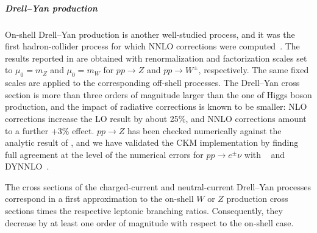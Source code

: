 \documentclass[english,11pt]{article}
\begin{document}
\newcommand{\mlll}{\ensuremath{m_{\ell\ell\ell}}}
\newcommand{\mwz}{\ensuremath{m_{WZ}}}
\newcommand{\mtw}{\ensuremath{m_{T,W}}}
\newcommand{\ptwz}{\ensuremath{p_{T,WZ}}}
\newcommand{\ptz}{\ensuremath{p_{T,Z}}}
\newcommand{\ptl}{\ensuremath{p_{T,\ell}}}
\newcommand{\ptlp}{\ensuremath{p_{T,\ell'}}}
\newcommand{\ptlsub}{\ensuremath{p_{T,\ell_{\ge2}}}}
\newcommand{\lw}{\ensuremath{\ell_{\textrm{w}}}}
\newcommand{\lpw}{\ensuremath{\ell^+_{\textrm{w}}}}
\newcommand{\lmw}{\ensuremath{\ell^-_{\textrm{w}}}}
\newcommand{\lpmw}{\ensuremath{\ell^{\pm}_{\textrm{w}}}}

\newcommand{\lz}{\ensuremath{\ell_{\textrm{z}}}}
\newcommand{\lpz}{\ensuremath{\ell^+_{\textrm{z}}}}
\newcommand{\lmz}{\ensuremath{\ell^-_{\textrm{z}}}}
\newcommand{\lpmz}{\ensuremath{\ell^{\pm}_{\textrm{z}}}}
\newcommand{\lzlead}{\ensuremath{\ell_{\textrm{z},1}}}
\newcommand{\lzsubl}{\ensuremath{\ell_{\textrm{z},2}}}

\newcommand{\ptlz}{\ensuremath{p_{T,\lz}}}
\newcommand{\ptlw}{\ensuremath{p_{T,\lw}}}
\newcommand{\ptlzlead}{\ensuremath{p_{T,\lzlead}}}
\newcommand{\ptlzsubl}{\ensuremath{p_{T,\lzsubl}}}


\subparagraph{Drell--Yan production}\quad

On-shell Drell--Yan production is another well-studied process, and it was
the first hadron-collider process for which NNLO corrections were computed~\cite{Hamberg:1990np,Harlander:2002wh}.
The results reported in  are obtained with renormalization and factorization scales set to $\mu_0=m_Z$ and $\mu_0=m_W$ for $pp\to Z$ and $pp\to W^\pm$,
respectively. The same fixed scales are applied to the corresponding off-shell processes. The Drell--Yan cross section is more than three orders of magnitude larger than the one 
of Higgs boson production, and the impact of radiative corrections is known to be smaller: 
NLO corrections increase the LO result by about 25\%, and NNLO corrections amount to a further +3\% effect.
$pp\to Z$ has been checked numerically against the analytic result of , and we have validated the CKM implementation by 
finding full agreement at the level of the numerical errors for $pp\to e^\pm\nu$ with \FEWZ{}~\cite{Gavin:2012sy} and {\sc DYNNLO}~\cite{Catani:2009sm}.

The cross sections of the charged-current and neutral-current Drell--Yan processes correspond
in a first approximation to the on-shell $W$ or $Z$ production cross sections times the respective
leptonic branching ratios.
Consequently, they decrease by at least one order of magnitude with respect to the on-shell case.
\end{document}
